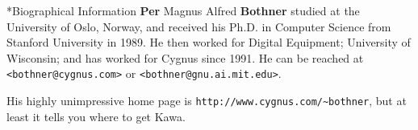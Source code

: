 \documentclass[twocolumn]{article}
\makeatletter
\def\section{\@startsection {section}{1}{\z@}
   {14pt plus 2pt minus 2pt}{12pt plus 2pt minus 2pt} {\large\bf}}
\makeatother
\begin{document}



\section*{Biographical Information}
{\bf Per} Magnus Alfred {\bf Bothner} studied at
the University of Oslo, Norway,
and received his {Ph.D.} in Computer Science from Stanford University in 1989.
He then worked for Digital Equipment; University of
Wisconsin; and has worked for Cygnus since 1991.
He can be reached at {\tt <bothner@cygnus.com>}
or {\tt <bothner@gnu.ai.mit.edu>}.

His highly unimpressive home page is
{\tt http:\discretionary{}{}{}//www.cygnus.com/\verb|~bothner|},
but at least it tells you where to get Kawa.
\end{document}
